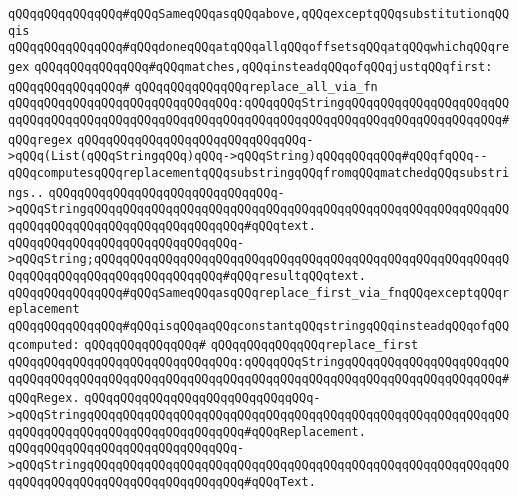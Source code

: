 \newline
\newline
\verb|qQQqqQQqqQQqqQQq#qQQqSameqQQqasqQQqabove,qQQqexceptqQQqsubstitutionqQQqis|\newline
\verb|qQQqqQQqqQQqqQQq#qQQqdoneqQQqatqQQqallqQQqoffsetsqQQqatqQQqwhichqQQqregex|\newline
\verb|qQQqqQQqqQQqqQQq#qQQqmatches,qQQqinsteadqQQqofqQQqjustqQQqfirst:|\newline
\verb|qQQqqQQqqQQqqQQq#|\newline
\verb|qQQqqQQqqQQqqQQqreplace_all_via_fn|\newline
\verb|qQQqqQQqqQQqqQQqqQQqqQQqqQQqqQQq:qQQqqQQqStringqQQqqQQqqQQqqQQqqQQqqQQqqQQqqQQqqQQqqQQqqQQqqQQqqQQqqQQqqQQqqQQqqQQqqQQqqQQqqQQqqQQqqQQqqQQq#qQQqregex|\newline
\verb|qQQqqQQqqQQqqQQqqQQqqQQqqQQqqQQq->qQQq(List(qQQqStringqQQq)qQQq->qQQqString)qQQqqQQqqQQq#qQQqfqQQq--qQQqcomputesqQQqreplacementqQQqsubstringqQQqfromqQQqmatchedqQQqsubstrings..|\newline
\verb|qQQqqQQqqQQqqQQqqQQqqQQqqQQqqQQq->qQQqStringqQQqqQQqqQQqqQQqqQQqqQQqqQQqqQQqqQQqqQQqqQQqqQQqqQQqqQQqqQQqqQQqqQQqqQQqqQQqqQQqqQQqqQQqqQQq#qQQqtext.|\newline
\verb|qQQqqQQqqQQqqQQqqQQqqQQqqQQqqQQq->qQQqString;qQQqqQQqqQQqqQQqqQQqqQQqqQQqqQQqqQQqqQQqqQQqqQQqqQQqqQQqqQQqqQQqqQQqqQQqqQQqqQQqqQQqqQQq#qQQqresultqQQqtext.|\newline
\newline
\newline
\verb|qQQqqQQqqQQqqQQq#qQQqSameqQQqasqQQqreplace_first_via_fnqQQqexceptqQQqreplacement|\newline
\verb|qQQqqQQqqQQqqQQq#qQQqisqQQqaqQQqconstantqQQqstringqQQqinsteadqQQqofqQQqcomputed:|\newline
\verb|qQQqqQQqqQQqqQQq#|\newline
\verb|qQQqqQQqqQQqqQQqreplace_first|\newline
\verb|qQQqqQQqqQQqqQQqqQQqqQQqqQQqqQQq:qQQqqQQqStringqQQqqQQqqQQqqQQqqQQqqQQqqQQqqQQqqQQqqQQqqQQqqQQqqQQqqQQqqQQqqQQqqQQqqQQqqQQqqQQqqQQqqQQqqQQq#qQQqRegex.|\newline
\verb|qQQqqQQqqQQqqQQqqQQqqQQqqQQqqQQq->qQQqStringqQQqqQQqqQQqqQQqqQQqqQQqqQQqqQQqqQQqqQQqqQQqqQQqqQQqqQQqqQQqqQQqqQQqqQQqqQQqqQQqqQQqqQQqqQQq#qQQqReplacement.|\newline
\verb|qQQqqQQqqQQqqQQqqQQqqQQqqQQqqQQq->qQQqStringqQQqqQQqqQQqqQQqqQQqqQQqqQQqqQQqqQQqqQQqqQQqqQQqqQQqqQQqqQQqqQQqqQQqqQQqqQQqqQQqqQQqqQQqqQQq#qQQqText.|\newline
